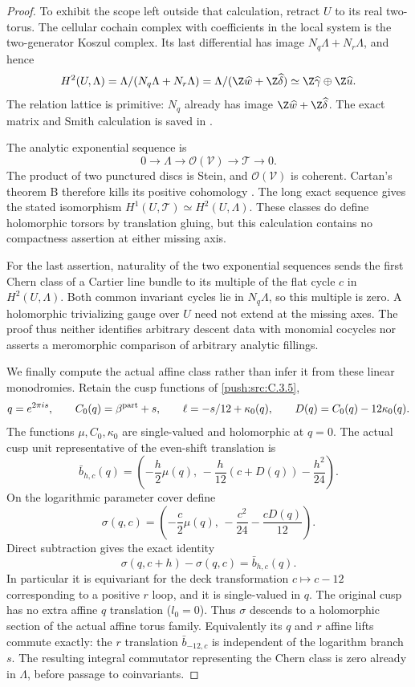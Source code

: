\begin{proof}
To exhibit the scope left outside that calculation,
retract $U$ to its real two-torus.  The cellular
cochain complex with coefficients in the local
system is the two-generator Koszul complex.
Its last differential has image
$N_q\Lambda+N_r\Lambda$, and hence
\[
 H^2(U,\Lambda)
   =\Lambda/(N_q\Lambda+N_r\Lambda)
   =\Lambda/(\Z\widehat w+\Z\widehat\delta)
   \simeq\Z\widehat\gamma\oplus\Z\widehat u.
\]
The relation lattice is primitive: $N_q$ already
has image $\Z\widehat w+\Z\widehat\delta$.
The exact matrix and Smith calculation is saved
in .

The analytic exponential sequence is
\[
 0\longrightarrow\Lambda\longrightarrow
 \mathcal O(\mathcal V)\longrightarrow
 \mathscr T\longrightarrow0.
\]
The product of two punctured discs is Stein,
and $\mathcal O(\mathcal V)$ is coherent.
Cartan's theorem B therefore kills its positive
cohomology
\citep[Section 5]{Cartan1952B_AB}.
The long exact sequence gives the stated
isomorphism $H^1(U,\mathscr T)\simeq H^2(U,\Lambda)$.
These classes do define holomorphic torsors by
translation gluing, but this calculation contains
no compactness assertion at either missing axis.

For the last assertion, naturality of the two
exponential sequences sends the first Chern class
of a Cartier line bundle to its multiple of the
flat cycle $c$ in $H^2(U,\Lambda)$.  Both common
invariant cycles lie in $N_q\Lambda$, so this
multiple is zero.  A holomorphic trivializing
gauge over $U$ need not extend at the missing
axes.  The proof thus neither identifies
arbitrary descent data with monomial cocycles
nor asserts a meromorphic comparison of
arbitrary analytic fillings.

We finally compute the actual affine class rather
than infer it from these linear monodromies.  Retain
the cusp functions of \ref{push:src:C.3.5},
\[
 q=e^{2\pi i s},\qquad
 C_0(q)=\beta^{\rm part}+s,\qquad
 \ell=-s/12+\kappa_0(q),
 \qquad D(q)=C_0(q)-12\kappa_0(q).
\]
The functions $\mu,C_0,\kappa_0$ are single-valued
and holomorphic at $q=0$.  The actual cusp unit
representative of the even-shift translation is
\[
 \bar b_{h,c}(q)=
 \left(-\frac h2\mu(q),\,
       -\frac h{12}(c+D(q))-\frac{h^2}{24}\right).
\]
On the logarithmic parameter cover define
\[
 \sigma(q,c)=
 \left(-\frac c2\mu(q),\,
       -\frac{c^2}{24}-\frac{cD(q)}{12}\right).
\]
Direct subtraction gives the exact identity
\[
 \sigma(q,c+h)-\sigma(q,c)=\bar b_{h,c}(q).
\]
In particular it is equivariant for the deck
transformation $c\mapsto c-12$ corresponding to
a positive $r$ loop, and it is single-valued in
$q$.  The original cusp has no extra affine
$q$ translation ($l_0=0$).  Thus $\sigma$ descends
to a holomorphic section of the actual affine
torus family.  Equivalently its $q$ and $r$
affine lifts commute exactly: the $r$ translation
$\bar b_{-12,c}$ is independent of the logarithm
branch $s$.  The resulting integral commutator
representing the Chern class is zero already in
$\Lambda$, before passage to coinvariants.


\end{proof}
